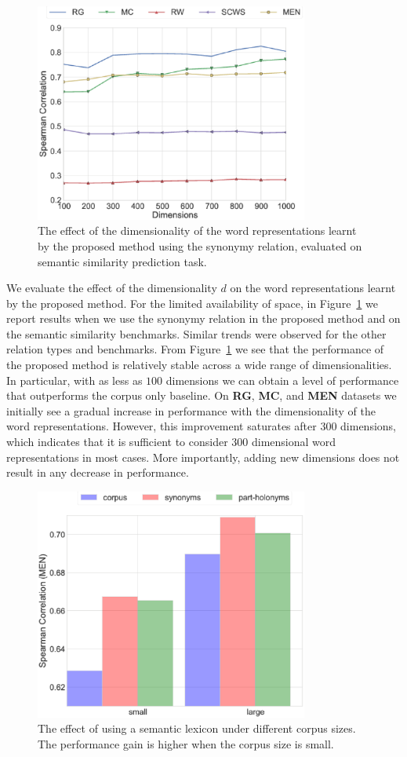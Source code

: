 \documentclass[letterpaper]{article}
\begin{document}
\begin{figure}[t]
\centering
\includegraphics[width=90mm]{dims.eps}
\caption{The effect of the dimensionality of the word representations learnt by the proposed method using
the synonymy relation, evaluated on semantic similarity prediction task.}
\label{fig:dims}
\end{figure}


We evaluate the effect of the dimensionality $d$ on the word representations learnt by the proposed method.
For the limited availability of space, in Figure~\ref{fig:dims}
we report results when we use the synonymy relation in the proposed method and on the semantic similarity benchmarks. 
Similar trends were observed for the other relation types and benchmarks.
From Figure~\ref{fig:dims} we see that the performance of the proposed method is relatively stable across a wide range of
dimensionalities. In particular, with as less as $100$ dimensions we can obtain a level of performance that outperforms the
corpus only baseline. 
On \textbf{RG}, \textbf{MC}, and \textbf{MEN} datasets we initially see a gradual increase in performance with the dimensionality of
the word representations. However, this improvement saturates after $300$ dimensions, which indicates that it is sufficient to
consider $300$ dimensional word representations in most cases. More importantly, adding new dimensions does not result in
any decrease in performance. 

\begin{figure}[t]
\centering
\includegraphics[width=90mm]{size.eps}
\caption{The effect of using a semantic lexicon under different corpus sizes. The performance gain is higher when the corpus size is small.}
\label{fig:size}
\end{figure}
\end{document}
